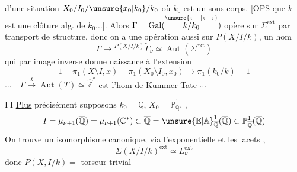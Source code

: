  d'une situation $X_0/I_0/\unsure{x_0|k_0}/k_0$
où $k_0$ est un sous-corps. [OPS  que
$k$ est une clôture alg. de $k_0\ldots$].
Alors $\Gamma=\operatorname{Gal}(\overset{\unsure{\longleftarrow|\longleftrightarrow}}{k/k_0})$ opère sur
$\Sigma^{\mathrm{ext}}$ par transport de structure, donc on a
une  opération aussi sur $P(X/I/k)$,
 un hom
\[
\Gamma\longrightarrow{}^{P(X/I/k)}\widetilde\Gamma_\nu
\simeq\operatorname{Aut}(\Sigma^{\mathrm{ext}})
\]
qui par image inverse  donne naissance
à l'extension
\[
1-\pi_1(X\setminus I,x)-\pi_1(X_0\setminus I_0,x_0)
\longrightarrow\pi_1(k_0/k)-1
\]
$\ldots\quad\Gamma\xrightarrow{\chi}\operatorname{Aut}(T)\simeq\widehat{\mathbb Z}^{*}$
est l'hom de Kummer-Tate $\ldots$

\textcircled{II} \uline{Plus} précisément supposons $k_0=\mathbb Q$, $X_0=\mathbb P^1_{\mathbb Q}$,
,
\[
I=\mu_{\nu+1}(\overline{\mathbb Q})=\mu_{\nu+1}(\mathbb C^{*})
\subset\overline{\mathbb Q}
=\unsure{\mathbb E|\mathbb A}^1_{\overline{\mathbb Q}}(\overline{\mathbb Q})
\subset\mathbb P^1_{\overline{\mathbb Q}}(\overline{\mathbb Q})
\]
On trouve un isomorphisme canonique,
via l'exponentielle et les lacets
,
\[
\Sigma(X/I/k)^{\mathrm{ext}}\simeq L_\nu^{\mathrm{ext}}
\]
donc $P(X,I/k)=$ torseur trivial
